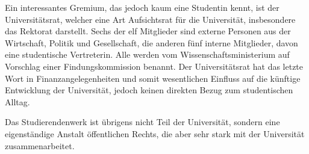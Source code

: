 Ein interessantes Gremium, das jedoch kaum eine Studentin kennt, ist der Universitätsrat, welcher eine Art Aufsichtsrat für die Universität, insbesondere das Rektorat darstellt. Sechs der elf Mitglieder sind externe Personen aus der Wirtschaft, Politik und Gesellschaft, die anderen fünf interne Mitglieder, davon eine studentische Vertreterin. Alle werden vom Wissenschaftsministerium auf Vorschlag einer Findungskommission benannt. Der Universitätsrat hat das letzte Wort in Finanzangelegenheiten und somit wesentlichen Einfluss auf die künftige Entwicklung der Universität, jedoch keinen direkten Bezug zum studentischen Alltag.



Das Studierendenwerk ist übrigens nicht Teil der Universität, sondern eine eigenständige Anstalt öffentlichen Rechts, die aber sehr stark mit der Universität zusammenarbeitet.

\vspace{-2mm}
